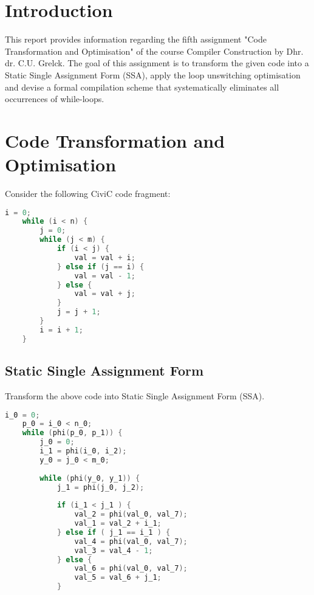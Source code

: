 \documentclass[hidelinks]{uva-inf-article}
\begin{document}
\section{Introduction}
\begin{flushleft}
\par This report provides information regarding the fifth assignment 
"Code Transformation and Optimisation" of the course Compiler Construction by Dhr.
dr. C.U. Grelck. The goal of this assignment is to transform the given code into 
a Static Single Assignment Form (SSA), apply the loop unswitching optimisation and
devise a formal compilation scheme that systematically eliminates all occurrences of 
while-loops.

\newpage
\section{Code Transformation and Optimisation}
Consider the following CiviC code fragment:
\begin{lstlisting}[basicstyle=\small, language=C, label=lst:code, caption=CiviC code fragment, captionpos=b]
    i = 0;
    while (i < n) {
        j = 0;
        while (j < m) {
            if (i < j) {
                val = val + i;
            } else if (j == i) {
                val = val - 1;
            } else {
                val = val + j;
            }
            j = j + 1;
        }
        i = i + 1;
    }
\end{lstlisting}

\subsection{Static Single Assignment Form}
Transform the above code into Static Single Assignment Form (SSA).

\begin{lstlisting}[basicstyle=\small, language=C, label=lst:code, caption=Static Single Assignment Form (SSA), captionpos=b]
    i_0 = 0;
    p_0 = i_0 < n_0;
    while (phi(p_0, p_1)) {
        j_0 = 0;
        i_1 = phi(i_0, i_2);
        y_0 = j_0 < m_0;
    
        while (phi(y_0, y_1)) {
            j_1 = phi(j_0, j_2);
    
            if (i_1 < j_1 ) {
                val_2 = phi(val_0, val_7);
                val_1 = val_2 + i_1;
            } else if ( j_1 == i_1 ) {
                val_4 = phi(val_0, val_7);
                val_3 = val_4 - 1;
            } else {
                val_6 = phi(val_0, val_7);
                val_5 = val_6 + j_1; 
            }
    

\end{lstlisting}
\end{flushleft}
\end{document}
